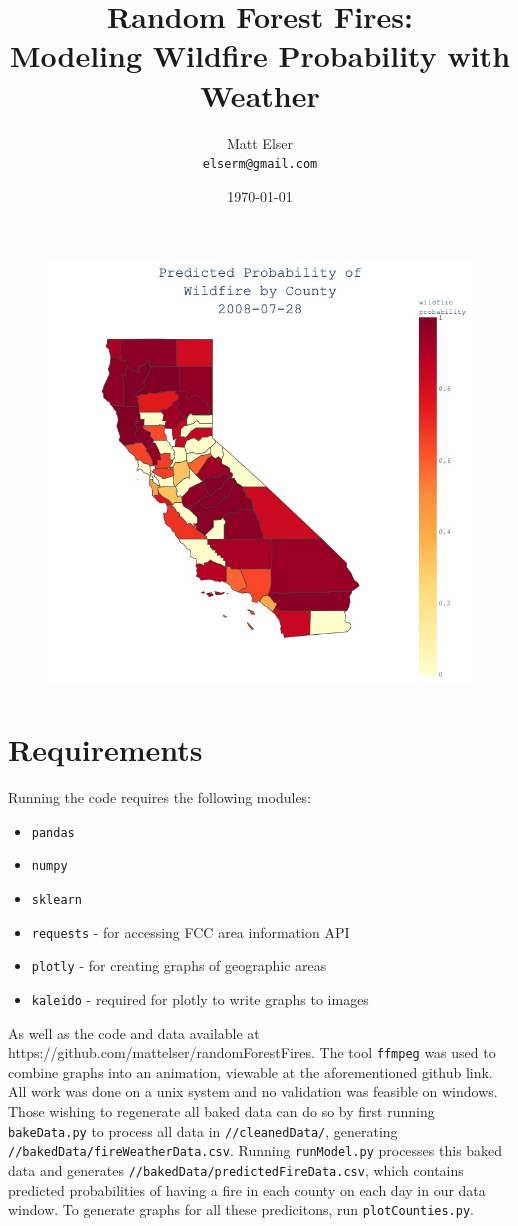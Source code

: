 \documentclass{article}
\title{Random Forest Fires:\\Modeling Wildfire Probability with Weather} %
\author{Matt Elser\\ \texttt{elserm@gmail.com}} %
\date{\today} %
\begin{document}
\maketitle %

\begin{figure}[h!]
	\centering
	\includegraphics[width=.5\linewidth]{images/animGraph_0189.jpg}
\end{figure}

\section{Requirements} %

Running the code requires the following modules:
\begin{itemize}
	\item \lstinline|pandas|
	\item \lstinline|numpy|
	\item \lstinline|sklearn|
	\item \lstinline|requests| - for accessing FCC area information API
	\item \lstinline|plotly| - for creating graphs of geographic areas
	\item \lstinline|kaleido| - required for plotly to write graphs to images
\end{itemize}

As well as the code and data available at https://github.com/mattelser/randomForestFires. The tool \lstinline|ffmpeg| was used to combine graphs into an animation, viewable at the aforementioned github link. All work was done on a unix system and no validation was feasible on windows. Those wishing to regenerate all baked data can do so by first running \lstinline|bakeData.py| to process all data in \lstinline|//cleanedData/|, generating \lstinline|//bakedData/fireWeatherData.csv|. Running \lstinline|runModel.py| processes this baked data and generates \lstinline|//bakedData/predictedFireData.csv|, which contains predicted probabilities of having a fire in each county on each day in our data window. To generate graphs for all these predicitons, run \lstinline|plotCounties.py|. 
\end{document}
